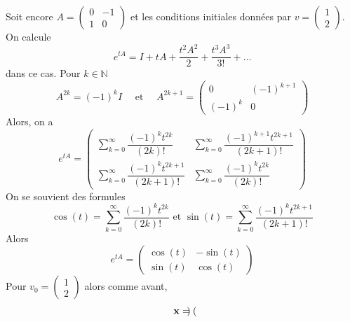 \begin{example} 
  Soit encore 
  $A =
  \begin{pmatrix}
    0 & -1\\
    1 & 0
  \end{pmatrix}$ et les conditions initiales données par $v =  \left(\begin{smallmatrix}
    1\\2
  \end{smallmatrix}\right)$.
  On calcule 
  \begin{displaymath}
    e^{tA} =  I+tA+\dfrac{t^{2}A^{2}}{2}+\dfrac{t^{3}A^{3}}{3!}+\dots 
  \end{displaymath}
dans ce cas. 
Pour  $k∈ ℕ$ 
\begin{displaymath}
  A^{2k}=(-1)^{k} I  \quad \text{ et } \quad  A^{2k+1}=
\begin{pmatrix}
    0 & (-1)^{k+1}\\
    (-1)^{k} & 0
\end{pmatrix} 
\end{displaymath}
Alors, on a 
\begin{displaymath} 
  e^{tA} = 
  \begin{pmatrix} \displaystyle 
     \sum_{k=0}^{\infty}\dfrac{(-1)^{k}t^{2k}}{(2k)!} &  \displaystyle \sum_{k=0}^{\infty}\dfrac{(-1)^{k+1}t^{2k+1}}{(2k+1)!}\\
    \displaystyle \sum_{k=0}^{\infty}\dfrac{(-1)^{k}t^{2k+1}}{(2k+1)!} & \displaystyle \sum_{k=0}^{\infty}\dfrac{(-1)^{k}t^{2k}}{(2k)!}
\end{pmatrix}
\end{displaymath}
On se souvient des formules 
\begin{displaymath}
  \cos(t) =\displaystyle \sum_{k=0}^{\infty}\dfrac{(-1)^{k}t^{2k}}{(2k)!} \text{ et }\sin(t) =\displaystyle \sum_{k=0}^{\infty}\dfrac{(-1)^{k}t^{2k+1}}{(2k+1)!} 
\end{displaymath}
Alors
\begin{displaymath}
  e^{tA} = \begin{pmatrix}
    \cos(t)&-\sin(t)\\
    \sin(t)&\cos(t)
  \end{pmatrix}
\end{displaymath}
Pour  $v_0 = 
\begin{pmatrix}
    1\\
    2
\end{pmatrix} $ 
alors comme avant, 
\begin{displaymath}
  \mathbf{x} = \begin{pmatrix}

\end{pmatrix}
\end{displaymath}
\end{example}
